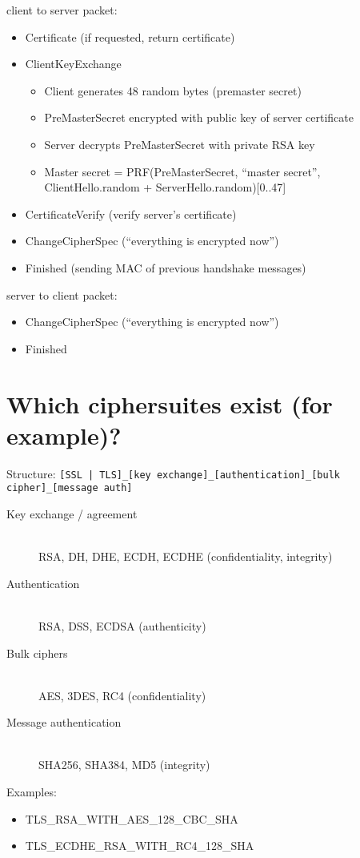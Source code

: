 \documentclass[twocolumn]{article}
\newcommand{\question}[1]{\section{#1}}
\begin{document}
%
client to server packet:
%
\begin{itemize}
  \item Certificate (if requested, return certificate)
  \item ClientKeyExchange
    \begin{itemize}
      \item Client generates 48 random bytes (premaster secret)
      \item PreMasterSecret encrypted with public key of server certificate
      \item Server decrypts PreMasterSecret with private RSA key
      \item Master secret = PRF(PreMasterSecret, ``master secret'', ClientHello.random + ServerHello.random)[0..47]
    \end{itemize}
  \item CertificateVerify (verify server's certificate)
  \item ChangeCipherSpec (``everything is encrypted now'')
  \item Finished (sending MAC of previous handshake messages)
\end{itemize}
%
server to client packet:
%
\begin{itemize}
  \item ChangeCipherSpec (``everything is encrypted now'')
  \item Finished
\end{itemize}

\question{Which ciphersuites exist (for example)?}
%
Structure: \texttt{[SSL | TLS]\_[key exchange]\_[authentication]\_[bulk cipher]\_[message auth]}
%
\begin{description}
  \item[Key exchange / agreement]\hfill{}\\
    RSA, DH, DHE, ECDH, ECDHE (confidentiality, integrity)
  \item[Authentication]\hfill{}\\
    RSA, DSS, ECDSA (authenticity)
  \item[Bulk ciphers]\hfill{}\\
    AES, 3DES, RC4 (confidentiality)
  \item[Message authentication]\hfill{}\\
    SHA256, SHA384, MD5 (integrity)
\end{description}

Examples:
\begin{itemize}
  \item TLS\_RSA\_WITH\_AES\_128\_CBC\_SHA
  \item TLS\_ECDHE\_RSA\_WITH\_RC4\_128\_SHA
\end{itemize}
\end{document}

